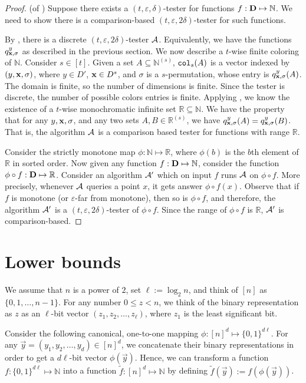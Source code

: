 \documentclass[11pt]{article}
\def\eps{\varepsilon}
\def\R{{\mathbb R}}
\def\x{{\bf x}}
\newcommand{\cA}{{\cal A}}
\newcommand{\NN}{\mathbb{N}}
\begin{document}
\begin{proof} (of ) 
Suppose there exists a $(t,\eps,\delta)$-tester for functions $f:\D\mapsto \NN$. We need to show there is a comparison-based $(t,\eps,2\delta)$-tester for such functions.

By , there is a discrete $(t,\eps,2\delta)$-tester $\cA$. Equivalently, we have the functions $q^y_{\x,\sigma}$ as described in the previous section.
We now describe a $t$-wise finite coloring of $\NN$. 
Consider $s \in [t]$.
Given a set $A\subseteq \NN^{(s)}$, ${\tt col}_s(A)$ is a vector indexed by $(y,\x,\sigma)$, where $y\in D'$, $\x\in D^s$, and $\sigma$ is a $s$-permutation, whose entry is $q^y_{\x,\sigma}(A)$.
The domain is finite, so the number of dimensions is finite.
Since the tester is discrete, the number of possible colors entries is finite.  
Applying , we know the existence of a $t$-wise monochromatic infinite set $\R\subseteq \NN$. We have the property that for any $y,\x,\sigma$, and any two sets $A,B \in \R^{(s)}$, we have $q^y_{\x,\sigma}(A) = q^y_{\x,\sigma}(B)$. That is, the algorithm $\cA$ is a comparison based tester for functions with range $\R$. 



Consider the strictly monotone map $\phi: \NN \mapsto \R$, where $\phi(b)$ is the $b$th element of $\R$  in sorted order. Now given any function $f:\D\mapsto \NN$, consider the function $\phi\circ f:\D\mapsto \R$. 
Consider an algorithm $\cA'$ which on input $f$ runs $\cA$ on $\phi\circ f$. More precisely, whenever $\cA$ queries a point $x$, it gets answer $\phi\circ f(x)$.  Observe that if $f$ is monotone (or $\eps$-far from monotone), then so is $\phi\circ f$, and therefore, the algorithm $\cA'$ is a $(t,\eps,2\delta)$-tester of $\phi\circ f$. Since the range of $\phi\circ f$ is $\R$,  
$\cA'$ is comparison-based.
\end{proof}

\section{Lower bounds} \label{sec:dist}

\def\f{\widetilde{f}}
\def\v{{\tt val}}
We assume that $n$ is a power of $2$, set $\ell:=\log_2 n$, and think of $[n]$ as $\{0,1,\ldots,n-1\}$. 
For any number $0 \leq z < n$, we think of the binary representation as $z$ as an $\ell$-bit vector $(z_1, z_2, \ldots, z_\ell)$,
where $z_1$ is the least significant bit.

Consider the following canonical, one-to-one mapping $\phi: [n]^d \mapsto \{0,1\}^{d\ell}$.
For any $\vec{y} = (y_1, y_2, \ldots, y_d) \in [n]^d$, we concatenate their binary representations in order 
to get a $d\ell$-bit vector $\phi(\vec{y})$. Hence, we can transform a function $f:\{0,1\}^{d\ell}\mapsto \NN$
into a function $\f:[n]^d \mapsto \NN$ by defining $\f(\vec{y}) := f(\phi(\vec{y}))$.
\end{document}
